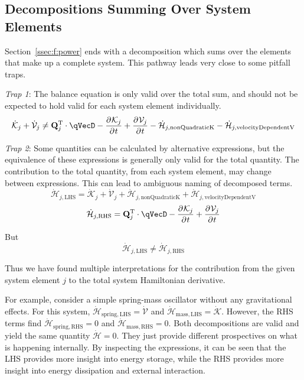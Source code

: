 \documentclass[11pt]{article}
\renewcommand{\secref}[1]{Section~\ref{#1}}
\newcommand{\pD}[2]{
    \frac{\partial\mspace{1mu}#1}{\partial\mspace{1mu}#2}
}
\begin{document}
\subsection{Decompositions Summing Over System Elements} \label{ssec:f:decompositions}
\secref{ssec:f:power} ends with a decomposition which sums over the elements that make up a complete system. This pathway leads very close to some pitfall traps.

\textit{Trap 1}: The balance equation is only valid over the total sum, and should not be expected to hold valid for each system element individually.
\begin{equation*}
    \dot{\mathcal{K}}_j + \dot{\mathcal{V}}_j
    \neq \mathbf{Q}_j^{\mathrm{T}} \cdot \qVecD
    - \pD{\mathcal{K}_j}{t}
    + \pD{\mathcal{V}_j}{t}
    - \dot{\mathcal{H}}_{j,\mathrm{nonQuadraticK}}
    - \dot{\mathcal{H}}_{j,\mathrm{velocityDependentV}}
\end{equation*}

\textit{Trap 2}: Some quantities can be calculated by alternative expressions, but the equivalence of these expressions is generally only valid for the total quantity. The contribution to the total quantity, from each system element, may change between expressions. This can lead to ambiguous naming of decomposed terms.
\begin{equation*}
    \dot{\mathcal{H}}_{j,\mathrm{LHS}} = \dot{\mathcal{K}}_j + \dot{\mathcal{V}}_j + \dot{\mathcal{H}}_{j,\mathrm{nonQuadraticK}} + \dot{\mathcal{H}}_{j,\mathrm{velocityDependentV}}
\end{equation*}
\begin{equation*}
    \dot{\mathcal{H}}_{j,\mathrm{RHS}} = \mathbf{Q}_j^{\mathrm{T}} \cdot \qVecD - \pD{\mathcal{K}_j}{t} + \pD{\mathcal{V}_j}{t}
\end{equation*}

But
\begin{equation*}
    \dot{\mathcal{H}}_{j,\mathrm{LHS}} \neq \dot{\mathcal{H}}_{j,\mathrm{RHS}}
\end{equation*}

Thus we have found multiple interpretations for the contribution from the given system element $j$ to the total system Hamiltonian derivative.

For example, consider a simple spring-mass oscillator without any gravitational effects. For this system, $\dot{\mathcal{H}}_{\mathrm{spring},\mathrm{LHS}} = \dot{\mathcal{V}}$ and $\dot{\mathcal{H}}_{\mathrm{mass},\mathrm{LHS}} = \dot{\mathcal{K}}$. However, the RHS terms find $\dot{\mathcal{H}}_{\mathrm{spring},\mathrm{RHS}}=0$ and $\dot{\mathcal{H}}_{\mathrm{mass},\mathrm{RHS}}=0$. Both decompositions are valid and yield the same quantity $\dot{\mathcal{H}}=0$. They just provide different prospectives on what is happening internally. By inspecting the expressions, it can be seen that the LHS provides more insight into energy storage, while the RHS provides more insight into energy dissipation and external interaction.
\end{document}
